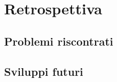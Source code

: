 \documentclass{article}
\begin{document}
    \newpage


    \section{Retrospettiva}

    \subsection{Problemi riscontrati}

    \subsection{Sviluppi futuri}

    \newpage
\end{document}
